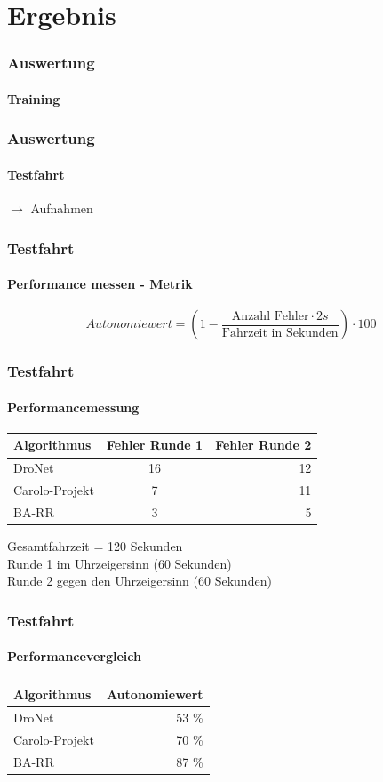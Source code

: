\documentclass{beamer}
\begin{document}
\section{Ergebnis}
\frame{\tableofcontents[currentsection]}

\begin{frame}
\frametitle{Auswertung}
\framesubtitle{Training}

\end{frame}


\begin{frame}
\frametitle{Auswertung}
\framesubtitle{Testfahrt}

\centering
{\huge $\xrightarrow{}$} {\huge Aufnahmen} 

\end{frame}

\begin{frame}
\frametitle{Testfahrt}
\framesubtitle{Performance messen - Metrik}
\begin{equation}
Autonomiewert = (1 -  \frac{\text{Anzahl Fehler}\cdot 2 s}{\text{Fahrzeit in Sekunden}})\cdot 100
\end{equation}
\end{frame}

\begin{frame}
\frametitle{Testfahrt}
\framesubtitle{Performancemessung}
\begin{table}[h]
  \begin{center}
    \label{tab:testfahrten}
    \begin{tabular}{l|c|r} 
      \textbf{Algorithmus} & \textbf{Fehler Runde 1} & \textbf{Fehler Runde 2}\\
      \hline
      DroNet & 16 & 12\\
      Carolo-Projekt & 7 & 11\\
       BA-RR& 3 & 5\\
    \end{tabular}
  \end{center}
\end{table}
Gesamtfahrzeit = 120 Sekunden\\
Runde 1 im Uhrzeigersinn (60 Sekunden)\\
Runde 2 gegen den Uhrzeigersinn (60 Sekunden)

\end{frame}

\begin{frame}
\frametitle{Testfahrt}
\framesubtitle{Performancevergleich}

\begin{table}[h]
  \begin{center}
    \label{tab:autonomie}
    \begin{tabular}{l|r}
      \textbf{Algorithmus} & \textbf{Autonomiewert} \\
      \hline
      DroNet & 53 \% \\
      Carolo-Projekt & 70 \%  \\
       BA-RR& 87 \% \\
    \end{tabular}
  \end{center}
\end{table}

\end{frame}
\end{document}
